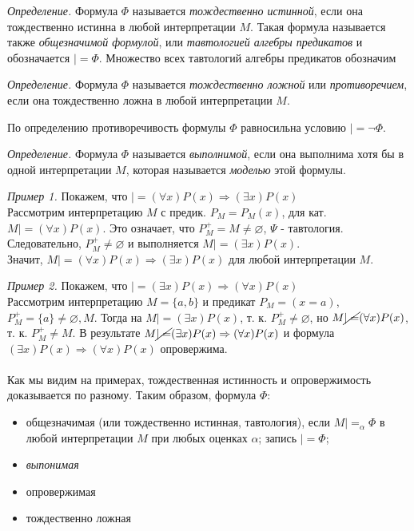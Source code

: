 \documentclass{SCWorks}
\begin{document}
\par {\it Определение.} Формула $\Phi$ называется {\it тождественно истинной}, если она тождественно истинна в любой интерпретации $M$. Такая формула называется также {\it общезначимой формулой}, или {\it тавтологией алгебры предикатов} и обозначается $|= \Phi$. Множество всех тавтологий алгебры предикатов обозначим %
\par {\it Определение.} Формула $\Phi$ называется {\it тождественно ложной} или {\it противоречием}, если она тождественно ложна в любой интерпретации $M$.
\par По определению противоречивость формулы $\Phi$ равносильна условию $|= \neg \Phi$.
\par {\it Определение.} Формула $\Phi$ называется {\it выполнимой}, если она выполнима хотя бы в одной интерпретации $M$, которая называется {\it моделью} этой формулы.
\par {\it Пример 1.} Покажем, что $|= (\forall x)P(x) \Rightarrow (\exists x)P(x)$ \\
Рассмотрим интерпретацию $M$ с предик. $P_M=P_M(x)$, для кат. $M |= (\forall x)P(x)$. Это означает, что $P_M^+ = M \neq \varnothing$, $\Psi$ - тавтология. Следовательно, $P_M^+ \neq \varnothing$ и выполняется $M |= (\exists x)P(x)$. \\
Значит, $M |= (\forall x)P(x) \Rightarrow (\exists x)P(x)$ для любой интерпретации $M$.

\par {\it Пример 2.} Покажем, что $|= (\exists x)P(x) \Rightarrow (\forall x)P(x)$ \\
Рассмотрим интерпретацию $M=\{a, b\}$ и предикат $P_M=(x=a)$, $P_M^+ = \{a\} \neq \varnothing, M$. Тогда на $M |= (\exists x)P(x)$, т. к. $P_M^+ \neq \varnothing$, но $M \cancel{|=}(\forall x)P(x)$, т. к. $P_M^+ \neq M$. В результате $M \cancel{|=} (\exists x)P(x) \Rightarrow (\forall x)P(x)$ и формула $(\exists x)P(x) \Rightarrow (\forall x)P(x)$ опровержима. \\
\\
Как мы видим на примерах, тождественная истинность и опровержимость доказывается по разному. Таким образом, формула $\Phi$:
\begin{itemize}
    \item общезначимая (или тождественно истинная, тавтология), если $M |=_\alpha \Phi$ в любой интерпретации $M$ при любых оценках $\alpha$; запись $|=\Phi$;
    \item {\it выпонимая}
    \item опровержимая
    \item тождественно ложная
\end{itemize}
\end{document}
